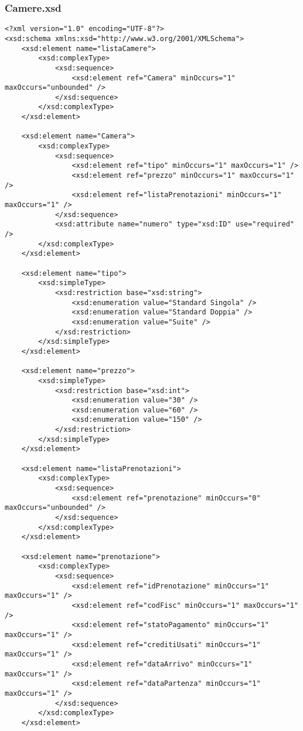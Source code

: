\documentclass [a4paper, 12pt]{book}
\begin{document}
\subsubsection{Camere.xsd}
\begin{lstlisting}[style=XML]
<?xml version="1.0" encoding="UTF-8"?>
<xsd:schema xmlns:xsd="http://www.w3.org/2001/XMLSchema">
    <xsd:element name="listaCamere">
        <xsd:complexType>
            <xsd:sequence>
                <xsd:element ref="Camera" minOccurs="1" maxOccurs="unbounded" />
            </xsd:sequence>
        </xsd:complexType>
    </xsd:element>

    <xsd:element name="Camera">
        <xsd:complexType>
            <xsd:sequence>
                <xsd:element ref="tipo" minOccurs="1" maxOccurs="1" />
                <xsd:element ref="prezzo" minOccurs="1" maxOccurs="1" />
                <xsd:element ref="listaPrenotazioni" minOccurs="1" maxOccurs="1" />
            </xsd:sequence>
            <xsd:attribute name="numero" type="xsd:ID" use="required" />
        </xsd:complexType>
    </xsd:element>

    <xsd:element name="tipo">
        <xsd:simpleType>
            <xsd:restriction base="xsd:string">
                <xsd:enumeration value="Standard Singola" />
                <xsd:enumeration value="Standard Doppia" />
                <xsd:enumeration value="Suite" />
            </xsd:restriction>
        </xsd:simpleType>
    </xsd:element>

    <xsd:element name="prezzo">
        <xsd:simpleType>
            <xsd:restriction base="xsd:int">
                <xsd:enumeration value="30" />
                <xsd:enumeration value="60" />
                <xsd:enumeration value="150" />
            </xsd:restriction>
        </xsd:simpleType>
    </xsd:element>

    <xsd:element name="listaPrenotazioni">
        <xsd:complexType>
            <xsd:sequence>
                <xsd:element ref="prenotazione" minOccurs="0" maxOccurs="unbounded" />
            </xsd:sequence>
        </xsd:complexType>
    </xsd:element>

    <xsd:element name="prenotazione">
        <xsd:complexType>
            <xsd:sequence>
                <xsd:element ref="idPrenotazione" minOccurs="1" maxOccurs="1" />
                <xsd:element ref="codFisc" minOccurs="1" maxOccurs="1" />
                <xsd:element ref="statoPagamento" minOccurs="1" maxOccurs="1" />
                <xsd:element ref="creditiUsati" minOccurs="1" maxOccurs="1" />
                <xsd:element ref="dataArrivo" minOccurs="1" maxOccurs="1" />
                <xsd:element ref="dataPartenza" minOccurs="1" maxOccurs="1" />
            </xsd:sequence>
        </xsd:complexType>
    </xsd:element>


\end{lstlisting}
\end{document}

